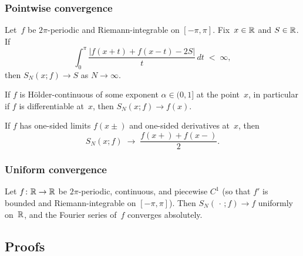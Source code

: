 \subsubsection*{Pointwise convergence}

\begin{theorem}
\label{thm:dini}
Let~$f$ be $2\pi$-periodic and Riemann-integrable on $[-\pi, \pi]$.
Fix~$x \in \mathbb{R}$ and $S \in \mathbb{R}$. If
\[
  \int_{0}^{\pi} \frac{|f(x + t) + f(x - t) - 2S|}{t}\, dt \;<\; \infty,
\]
then $S_N(x; f) \to S$ as $N \to \infty$.
\end{theorem}

\begin{corollary}
\label{cor:dini-holder}
If $f$ is Hölder-continuous of some exponent $\alpha \in (0, 1]$ at the
point~$x$, in particular if $f$ is differentiable at~$x$, then
$S_N(x; f) \to f(x)$.
\end{corollary}

\begin{corollary}
\label{cor:jump}
If $f$ has one-sided limits $f(x \pm)$ and one-sided derivatives at~$x$,
then
\[
  S_N(x; f) \;\to\; \frac{f(x+) + f(x-)}{2}.
\]
\end{corollary}

\subsubsection*{Uniform convergence}

\begin{theorem}
\label{thm:uniform-c1}
Let $f \colon \mathbb{R} \to \mathbb{R}$ be $2\pi$-periodic, continuous, and piecewise
$C^1$ (so that $f'$ is bounded and Riemann-integrable on
$[-\pi, \pi]$). Then $S_N(\,\cdot\,; f) \to f$ uniformly on~$\mathbb{R}$, and
the Fourier series of~$f$ converges absolutely.
\end{theorem}

\subsection*{Proofs}

